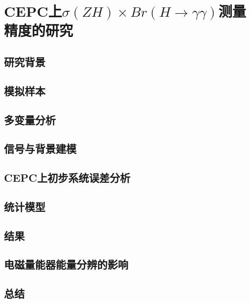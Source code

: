 \chapter{CEPC上$\sigma(ZH)\times Br(H \to \gamma\gamma)$测量精度的研究}
\label{chap:cepcHyy}

\section{研究背景}
\section{模拟样本}
\section{多变量分析}
\section{信号与背景建模}
\section{CEPC上初步系统误差分析}
\section{统计模型}
\section{结果}
\section{电磁量能器能量分辨的影响}
\section{总结}
